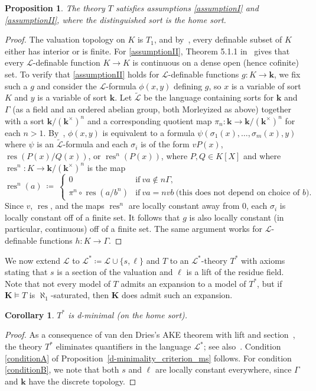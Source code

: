 \documentclass[11pt]{amsart}
\theoremstyle{plain}
\newtheorem{cor}[thm]{Corollary}
\newtheorem{prop}[thm]{Proposition}
\theoremstyle{definition}
\numberwithin{equation}{section}
\newcommand\0{\varnothing}
\renewcommand\L{\mathcal{L}}
\renewcommand\k{\boldsymbol{k}}
\DeclareMathOperator\res{res}
\begin{document}
\begin{prop}
The theory $T$ satisfies assumptions \ref{assumptionI} and \ref{assumptionII}, where the distinguished sort is the home sort. 
\end{prop}
\begin{proof}
The valuation topology on $K$ is $T_1$, and by~\cite[Proposition 5.1]{Fl11}, every definable subset of $K$ either has interior or is finite. For \ref{assumptionII}, Theorem 5.1.1 in~\cite{CHRK22} gives that every $\L$-definable function $K\to K$ is continuous on a dense open (hence cofinite) set. To verify that \ref{assumptionII} holds for $\L$-definable functions $g\colon K\to \k$, we fix such a $g$ and consider the $\L$-formula $\phi(x,y)$ defining $g$, so $x$ is a variable of sort $K$ and $y$ is a variable of sort $\k$. Let $\tilde{\L}$ be the language containing sorts for $\k$ and $\Gamma$ (as a field and an ordered abelian group, both Morleyized as above) together with a sort $\k/(\k^\times)^n$ and a corresponding quotient map $\pi_n\colon \k\to \k/(\k^\times)^n$ for each $n>1$. By~\cite[Theorem 5.15]{ACGZ}, $\phi(x,y)$ is equivalent to a formula $\psi(\sigma_1(x),\ldots,\sigma_m(x),y)$ where $\psi$ is an $\tilde{\L}$-formula and each $\sigma_i$ is of the form $vP(x)$, $\res(P(x)/Q(x))$, or $\res^n(P(x))$, where $P,Q \in K[X]$ and where $\res^n\colon K\to \k/(\k^\times)^n$ is the map
\[
\res^n(a)\ \coloneqq\ \begin{cases}
0& \text{if}\ va \not\in n\Gamma,\\
\pi^n\circ \res(a/b^n)& \text{if}\ va = nvb\ \text{(this does not depend on choice of $b$).}
\end{cases}
\]
Since $v$, $\res$, and the maps $\res^n$ are locally constant away from 0, each $\sigma_i$ is locally constant off of a finite set. It follows that $g$ is also locally constant (in particular, continuous) off of a finite set. 
The same argument works for $\L$-definable functions $h\colon K\to \Gamma$.
\end{proof}

\noindent
We now extend $\L$ to $\L^*\coloneqq \L\cup\{s,\ell\}$ and $T$ to an $\L^*$-theory $T^*$ with  axioms stating that $s$ is a section of the valuation and $\ell$ is a lift of the residue field. Note that not every model of $T$ admits an expansion to a model of $T^*$, but if $\bm{K}\models T$ is $\aleph_1$-saturated, then $\bm{K}$ does admit such an expansion. 


\begin{cor}
$T^*$ is d-minimal (on the home sort). 
\end{cor}
\begin{proof}
As a consequence of van den Dries's AKE theorem with lift and section~\cite[Section~5.3]{vdD14}, the theory $T^*$ eliminates quantifiers in the language $\L^*$; see also~\cite[Theorem 2.2]{Ke24}. Condition \ref{conditionA} of Proposition~\ref{d-minimality_criterion_ms} follows. For condition \ref{conditionB}, we note that both $s$ and $\ell$ are locally constant everywhere, since $\Gamma$ and $\k$ have the discrete topology. \end{proof}
\end{document}
